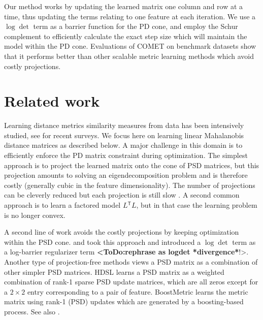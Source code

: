 \documentclass[twoside,11pt]{article}
\newcommand\todo[1]{\textbf{<ToDo:#1}!>}
\newcommand\mat[1]{{#1}}
\newcommand{\T}{{}^\mathsf{T}}
\newcommand{\ignore}[1]{}
\newcommand{\cholL}{\mat{L}}
\begin{document}
Our method works by updating the learned matrix one column and row at a time, thus updating the terms relating to one feature at each iteration. We use a $\log \det$ term as a barrier function for the PD cone, and employ the Schur complement to efficiently calculate the exact step size which will maintain the model within the PD cone. Evaluations of COMET on benchmark datasets show that it performs better than other scalable metric learning methods which avoid costly projections. 

\ignore{Furthermore an important challenge for metric learning is the case where the set of features is not fixed in advance, but changes with time. This is a typical scenario in many real life applications of learning: as more data accumulates, it is possible to estimate more parameters accurately, so more features and signals are gradually added to existing systems. It is therefore desirable to develop algorithms that can learn metrics in face of a growing feature set. Our method naturally adapts to this setting, by optimizing the metric matrix one column-row at a time.}

\section{Related work}
Learning distance metrics similarity measures from data has been intensively studied, see \citet{bellet2013survey, kulis2012survey} for recent surveys. We focus here on learning linear Mahalanobis distance matrices as described below. A major challenge in this domain is to efficiently enforce the PD matrix constraint during optimization. The simplest approach is to project the learned matrix onto the cone of PSD matrices, but this projection amounts to solving an eigendecomposition problem and is therefore costly (generally cubic in the feature dimensionality). The number of projections can be cleverly reduced but each projection is still slow \citep{qianHD, qian}. A second common approach is to learn a factored model $\cholL\T \cholL$, but in that case the learning problem is no longer convex. 

A second line of work avoids the costly projections by keeping optimization within the PSD cone. \citet{davis2007information} and \citet{lego} took this approach and introduced a $\log \det$ term as a log-barrier regularizer term \todo{rephrase as logdet *divergence*}. Another type of projection-free methods views a PSD matrix as a combination of other simpler PSD matrices. HDSL \citep{hdsl} learns a PSD matrix as a weighted combination of rank-1 sparse PSD update matrices, which are all zeros except for a $2\times2$ entry corresponding to a pair of feature. BoostMetric \citep{boost} learns the metric matrix using rank-1 (PSD) updates which are generated by a boosting-based process. See also \citet{bi2011adaboost, liu2012robust}.
\end{document}
